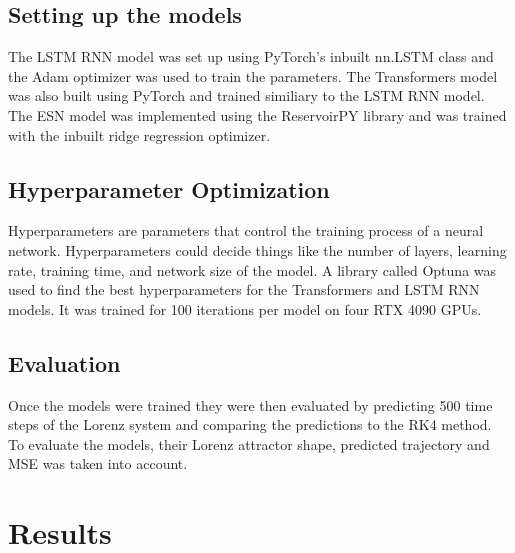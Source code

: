 \documentclass[11pt]{article}
\begin{document}
\subsection{Setting up the models}
The LSTM RNN model was set up using PyTorch's inbuilt nn.LSTM class and the Adam optimizer was used to train the parameters. The Transformers model was also built using PyTorch and trained similiary to the LSTM RNN model. The ESN model was implemented using the ReservoirPY library and was trained with the inbuilt ridge regression optimizer.

\subsection{Hyperparameter Optimization}
Hyperparameters are parameters that control the training process of a neural network. Hyperparameters could decide things like the number of layers, learning rate, training time, and network size of the model. A library called Optuna was used to find the best hyperparameters for the Transformers and LSTM RNN models. It was trained for 100 iterations per model on four RTX 4090 GPUs.

\subsection{Evaluation}
Once the models were trained they were then evaluated by predicting 500 time steps of the Lorenz system and comparing the predictions to the RK4 method. To evaluate the models, their Lorenz attractor shape, predicted trajectory and MSE
was taken into account.

\section{Results}
\end{document}
